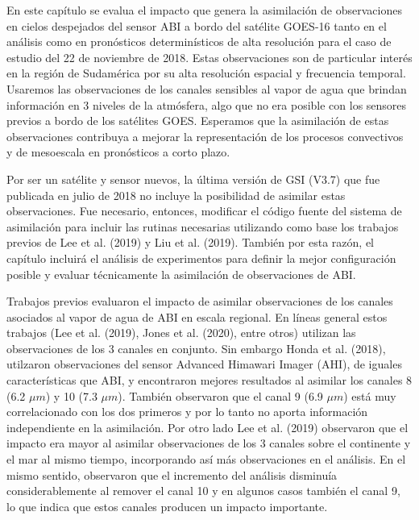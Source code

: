 \documentclass[12pt,oneside,a4paper]{reedthesis}
\begin{document}
En este capítulo se evalua el impacto que genera la asimilación de observaciones en cielos despejados del sensor ABI a bordo del satélite GOES-16 tanto en el análisis como en pronósticos determinísticos de alta resolución para el caso de estudio del 22 de noviembre de 2018. Estas observaciones son de particular interés en la región de Sudamérica por su alta resolución espacial y frecuencia temporal. Usaremos las observaciones de los canales sensibles al vapor de agua que brindan información en 3 niveles de la atmósfera, algo que no era posible con los sensores previos a bordo de los satélites GOES. Esperamos que la asimilación de estas observaciones contribuya a mejorar la representación de los procesos convectivos y de mesoescala en pronósticos a corto plazo.

Por ser un satélite y sensor nuevos, la última versión de GSI (V3.7) que fue publicada en julio de 2018 no incluye la posibilidad de asimilar estas observaciones. Fue necesario, entonces, modificar el código fuente del sistema de asimilación para incluir las rutinas necesarias utilizando como base los trabajos previos de Lee et al. (2019) y Liu et al. (2019). También por esta razón, el capítulo incluirá el análisis de experimentos para definir la mejor configuración posible y evaluar técnicamente la asimilación de observaciones de ABI.

Trabajos previos evaluaron el impacto de asimilar observaciones de los canales asociados al vapor de agua de ABI en escala regional. En líneas general estos trabajos (Lee et al. (2019), Jones et al. (2020), entre otros) utilizan las observaciones de los 3 canales en conjunto. Sin embargo Honda et al. (2018), utilzaron observaciones del sensor Advanced Himawari Imager (AHI), de iguales características que ABI, y encontraron mejores resultados al asimilar los canales 8 (6.2 \(\mu m\)) y 10 (7.3 \(\mu m\)). También observaron que el canal 9 (6.9 \(\mu m\)) está muy correlacionado con los dos primeros y por lo tanto no aporta información independiente en la asimilación. Por otro lado Lee et al. (2019) observaron que el impacto era mayor al asimilar observaciones de los 3 canales sobre el continente y el mar al mismo tiempo, incorporando así más observaciones en el análisis. En el mismo sentido, observaron que el incremento del análisis disminuía considerablemente al remover el canal 10 y en algunos casos también el canal 9, lo que indica que estos canales producen un impacto importante.
\end{document}
